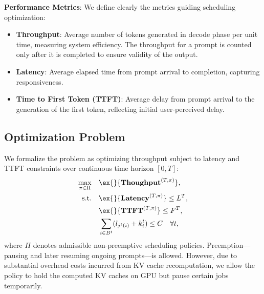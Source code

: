 \textbf{Performance Metrics}: We define clearly the metrics guiding scheduling optimization:
\begin{itemize}
    \item \textbf{Throughput}: Average number of tokens generated in decode phase per unit time, measuring system efficiency. The throughput for a prompt is counted only after it is completed to ensure validity of the output.
    \item \textbf{Latency}: Average elapsed time from prompt arrival to completion, capturing responsiveness.
    \item \textbf{Time to First Token (TTFT)}: Average delay from prompt arrival to the generation of the first token, reflecting initial user-perceived delay.
\end{itemize}

\subsection{Optimization Problem}
We formalize the problem as optimizing throughput subject to latency and TTFT constraints over continuous time horizon $[0,T]$:
\begin{align*}
    \max_{\pi \in \Pi} \quad &\ex{}{\throughput^{(T,\pi)}}, \\
    \text{s.t.}\quad & \ex{}{\Latency^{(T,\pi)}} \le L^T,\\
    & \ex{}{\TTFT^{(T,\pi)}} \le F^T, \\
    & \sum_{i \in B^t} (l_{j^t(i)} + k^t_i) \le C \quad \forall t,
\end{align*}
where $\Pi$ denotes admissible non-preemptive scheduling policies. Preemption—pausing and later resuming ongoing prompts—is allowed. However, due to substantial overhead costs incurred from KV cache recomputation, we allow the policy to hold the computed KV caches on GPU but pause certain jobs temporarily. 


